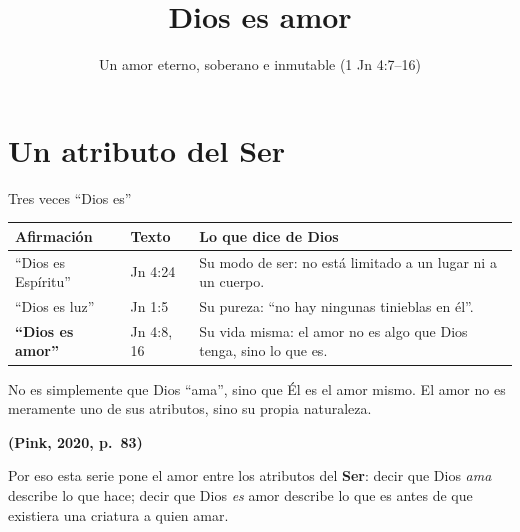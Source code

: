 \documentclass[hyperref={bookmarks=false},aspectratio=169]{beamer}
\title[Dios es amor]{\bfseries{Dios es amor}}
\subtitle{Un amor eterno, soberano e inmutable (1 Jn 4:7--16)}
\author{}\institute{}\date{}
\newcommand{\fuente}[1]{\par\hfill{\upshape\bfseries\footnotesize\textcolor{azul}{#1}}}
\newcommand{\destacar}[1]{\textbf{\textcolor{azul}{#1}}}
\begin{document}
\frame{\titlepage}


\section{Un atributo del Ser}

\begin{frame}{Tres veces ``Dios es''}
\small\renewcommand{\arraystretch}{1.25}
\begin{tabular}{@{}>{\RaggedRight\arraybackslash}p{3.0cm}>{\RaggedRight\arraybackslash}p{2.2cm}>{\RaggedRight\arraybackslash}p{6.8cm}@{}}
\toprule
\textbf{Afirmación} & \textbf{Texto} & \textbf{Lo que dice de Dios} \\ \midrule
``Dios es Espíritu'' & Jn 4:24 & Su modo de ser: no está limitado a un lugar ni a un cuerpo. \\
``Dios es luz'' & 1 Jn 1:5 & Su pureza: ``no hay ningunas tinieblas en él''. \\
\destacar{``Dios es amor''} & 1 Jn 4:8, 16 & Su vida misma: el amor no es algo que Dios tenga, sino lo que es. \\
\bottomrule
\end{tabular}\par\medskip
\begin{cita}No es simplemente que Dios ``ama'', sino que Él es el amor mismo. El amor no es meramente uno de sus atributos, sino su propia naturaleza.\fuente{(Pink, 2020, p.~83)}\end{cita}
\scriptsize Por eso esta serie pone el amor entre los atributos del \destacar{Ser}: decir que Dios \emph{ama} describe lo que hace; decir que Dios \emph{es} amor describe lo que es antes de que existiera una criatura a quien amar.
\end{frame}
\end{document}
